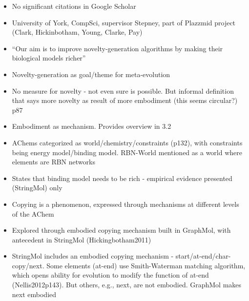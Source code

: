 		\begin{itemize}
			\item
			
			No significant citations in Google Scholar
			
			\item
			
			University of York, CompSci, supervisor Stepney, part of Plazzmid
			project (Clark, Hickinbotham, Young, Clarke, Pay)
			
			\item
			
			``Our aim is to improve novelty-generation algorithms by making their
			biological models richer''
			
			\item
			
			Novelty-generation as goal/theme for meta-evolution
			
			\item
			
			No measure for novelty - not even sure is possible. But informal
			definition that says more novelty as result of more embodiment (this
			seems circular?) p87
			
			\item
			
			Embodiment as mechanism. Provides overview in 3.2
			
			\item
			
			AChems categorized as world/chemistry/constraints (p132), with
			constraints being energy model/binding model. RBN-World mentioned as a
			world where elements are RBN networks
			
			\item
			
			States that binding model needs to be rich - empirical evidence
			presented (StringMol) only
			
			\item
			
			Copying is a phenomenon, expressed through mechanisms at different
			levels of the AChem
			
			\item
			
			Explored through embodied copying mechanism built in GraphMol, with
			antecedent in StringMol (Hickingbotham2011)
			
			\item
			
			StringMol includes an embodied copying mechanism -
			start/at-end/char-copy/next. Some elements (at-end) use Smith-Waterman
			matching algorithm, which opens ability for evolution to modify the
			function of at-end (Nellis2012p143). But others, e.g., next, are not
			embodied. GraphMol makes next embodied
			

\end{itemize}
